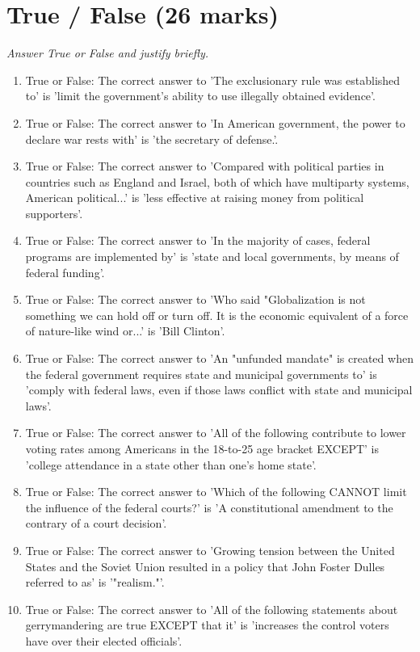 \documentclass[12pt]{article}
\begin{document}
\section*{True / False (26 marks)}
\textit{Answer True or False and justify briefly.}
\begin{enumerate}[label=\arabic*.]
\item True or False: The correct answer to 'The exclusionary rule was established to' is 'limit the government's ability to use illegally obtained evidence'.
\item True or False: The correct answer to 'In American government, the power to declare war rests with' is 'the secretary of defense.'.
\item True or False: The correct answer to 'Compared with political parties in countries such as England and Israel, both of which have multiparty systems, American political...' is 'less effective at raising money from political supporters'.
\item True or False: The correct answer to 'In the majority of cases, federal programs are implemented by' is 'state and local governments, by means of federal funding'.
\item True or False: The correct answer to 'Who said "Globalization is not something we can hold off or turn off. It is the economic equivalent of a force of nature-like wind or...' is 'Bill Clinton'.
\item True or False: The correct answer to 'An "unfunded mandate" is created when the federal government requires state and municipal governments to' is 'comply with federal laws, even if those laws conflict with state and municipal laws'.
\item True or False: The correct answer to 'All of the following contribute to lower voting rates among Americans in the 18-to-25 age bracket EXCEPT' is 'college attendance in a state other than one's home state'.
\item True or False: The correct answer to 'Which of the following CANNOT limit the influence of the federal courts?' is 'A constitutional amendment to the contrary of a court decision'.
\item True or False: The correct answer to 'Growing tension between the United States and the Soviet Union resulted in a policy that John Foster Dulles referred to as' is '"realism."'.
\item True or False: The correct answer to 'All of the following statements about gerrymandering are true EXCEPT that it' is 'increases the control voters have over their elected officials'.

\end{enumerate}
\end{document}
